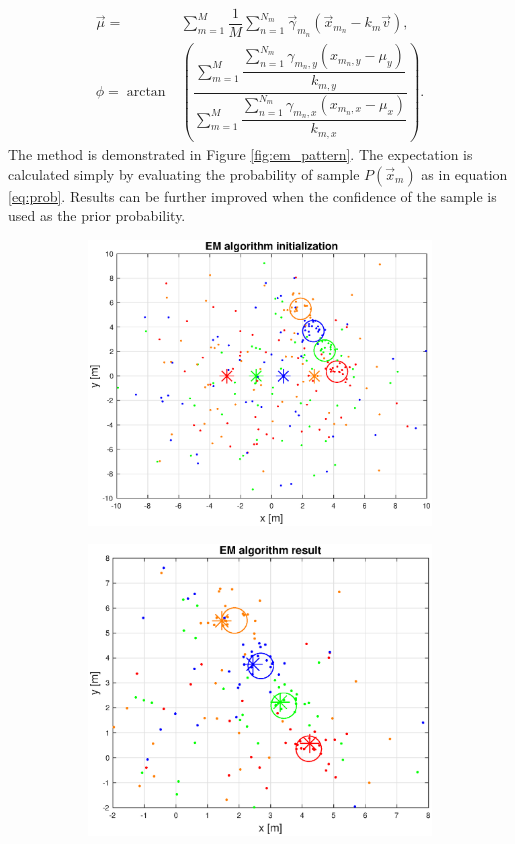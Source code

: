 \begin{align}
\vec{\mu} =& \sum_{m=1}^M \dfrac{1}{M}\sum_{n = 1}^{N_m}  \vec{\gamma}_{m_n} \left( \vec{x}_{m_n} - k_m \vec{v} \right) , \\
\phi = \arctan & \left( \dfrac{\sum_{m=1}^{M} \dfrac{\sum_{n = 1}^{N_m} \gamma_{m_n, y}(x_{m_n, y} - \mu_y)}{k_{m, y} } }{\sum_{m=1}^{M} \dfrac{\sum_{n = 1}^{N_m} \gamma_{m_n, x} (x_{m_n, x} - \mu_x) }{k_{m, x}} }\right).
\end{align}
The method is demonstrated in Figure \ref{fig:em_pattern}. The expectation is calculated simply by evaluating the probability of sample $P(\vec{x}_m)$ as in equation \ref{eq:prob}. Results can be further improved when the confidence of the sample is used as the prior probability.

\begin{figure}[H]
	\centering
	\begin{subfigure}{0.49\textwidth}
		\centering
		\includegraphics[scale=0.43]{fig/em_init.eps}
	\end{subfigure}
	\begin{subfigure}{.49\textwidth}
		\centering
		\includegraphics[scale=0.43]{fig/em_result.eps}


\end{subfigure}
\end{figure}
